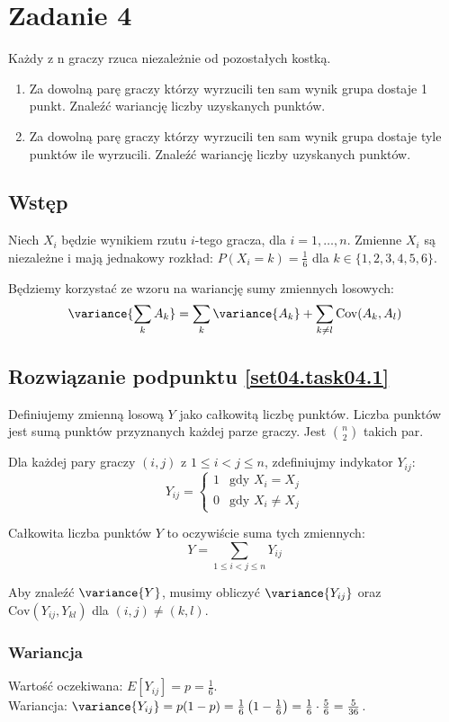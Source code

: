 \section{Zadanie 4}
Każdy z n graczy rzuca niezależnie od pozostałych kostką.
\begin{enumerate}[label=(\roman*)]
	\item\label{set04.task04.1} Za dowolną parę graczy którzy wyrzucili ten sam wynik grupa dostaje 1 punkt.
	      Znaleźć wariancję liczby uzyskanych punktów.
	\item\label{set04.task04.2} Za dowolną parę graczy którzy wyrzucili ten sam wynik grupa dostaje tyle punktów
	      ile wyrzucili. Znaleźć wariancję liczby uzyskanych punktów.
\end{enumerate}

\subsection*{Wstęp}
Niech \(X_i\) będzie wynikiem rzutu \(i\)-tego gracza, dla \(i = 1, \dots, n\).
Zmienne \(X_i\) są niezależne i mają jednakowy rozkład: \(P(X_i = k) = \frac{1}{6}\) dla \(k \in \{1, 2, 3, 4, 5, 6\}\).

Będziemy korzystać ze wzoru na wariancję sumy zmiennych losowych:
\[\variance{\sum_{k} A_k} = \sum_{k} \variance{A_k} + \sum_{k \neq l} \text{Cov}(A_k, A_l)\]

\subsection*{Rozwiązanie podpunktu \ref{set04.task04.1}}

Definiujemy zmienną losową \(Y\) jako całkowitą liczbę punktów.
Liczba punktów jest sumą punktów przyznanych każdej parze graczy. Jest \(\binom{n}{2}\) takich par.

Dla każdej pary graczy \((i, j)\) z \(1 \le i < j \le n\), zdefiniujmy indykator \(Y_{ij}\):
\[Y_{ij} = \begin{cases} 1 & \text{gdy } X_i = X_j \\ 0 & \text{gdy } X_i \neq X_j \end{cases}\]

Całkowita liczba punktów \(Y\) to oczywiście suma tych zmiennych:
\[Y = \sum_{1 \le i < j \le n} Y_{ij}\]

Aby znaleźć \(\variance{Y}\), musimy obliczyć \(\variance{Y_{ij}}\) oraz \(\text{Cov}(Y_{ij}, Y_{kl})\) dla \((i,j) \neq (k,l)\).
\subsubsection*{Wariancja}
Wartość oczekiwana: \(E[Y_{ij}] = p = \frac{1}{6}\). \\
Wariancja: \(\variance{Y_{ij}} = p(1-p) = \frac{1}{6} \left(1 - \frac{1}{6}\right) = \frac{1}{6} \cdot \frac{5}{6} = \frac{5}{36}\).
